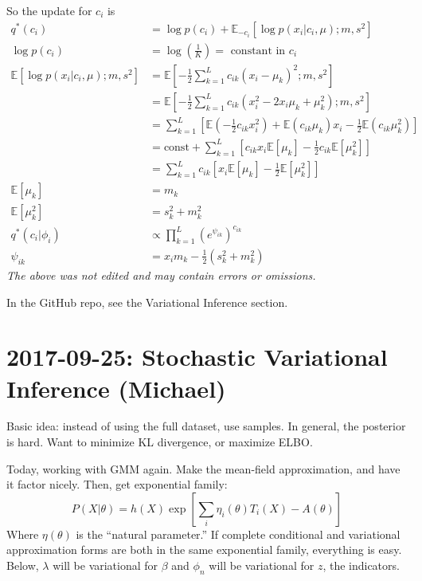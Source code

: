 \documentclass{article}
\newcommand{\E}{ \ensuremath{ \mathbb{E} }}
\begin{document}
So the update for $c_i$ is
\begin{align*}
  q^*(c_i) &= \log p(c_i) + \E_{-c_i} \left[ \log p(x_i | c_i, \mu) ; m, s^2 \right]
  \\
  \log p(c_i) &= \log \left( \frac{1}{K} \right) = \textrm{ constant in } c_i
  \\
  \E \left[ \log p(x_i | c_i, \mu) ; m, s^2 \right] &= \E \left[ -\frac12 \sum_{k=1}^L c_{ik}(x_i-\mu_k)^2 ; m, s^2 \right]
  \\
  &= \E \left[ -\frac12 \sum_{k=1}^L c_{ik}(x_i^2-2x_i\mu_k+\mu_k^2) ; m, s^2 \right]
  \\
  &= \sum_{k=1}^L \left[  \E \left( -\frac12  c_{ik} x_i^2 \right) + \E \left( c_{ik}\mu_k \right)x_i - \frac12 \E(c_{ik}\mu_k^2) \right]
  \\
  &= \textrm{const} + \sum_{k=1}^L \left[ c_{ik} x_i \E[\mu_k] - \frac12 c_{ik} \E[\mu_k^2] \right]
  \\
  &= \sum_{k=1}^L c_{ik} \left[ x_i \E[\mu_k] - \frac12 \E[\mu_k^2] \right]
  \\
  \E[\mu_k] &= m_k
  \\
  \E[\mu_k^2] &= s_k^2 + m_k^2
  \\
  q^*(c_i| \phi_i) &\propto \prod_{k=1}^L (e^{\psi_{ik}})^{c_{ik}}
  \\
  \psi_{ik} &= x_i m_k - \frac12 (s_k^2 + m_k^2)
\end{align*}
\emph{The above was not edited and may contain errors or omissions.}

In the GitHub repo, see the Variational Inference section.

\section{2017-09-25: Stochastic Variational Inference (Michael)}
Basic idea: instead of using the full dataset, use samples.
In general, the posterior is hard. Want to minimize KL divergence, or
maximize ELBO.

Today, working with GMM again. Make the mean-field approximation, and have it factor
nicely. Then, get exponential family:
\begin{equation*}
  P(X|\theta)=h(X)\exp \left[ \sum_i \eta_i(\theta) T_i(X)-A(\theta) \right]
\end{equation*}
Where $\eta(\theta)$ is the ``natural parameter.'' If complete conditional and variational
approximation forms are both in the same exponential family, everything is easy. Below, $\lambda$ will be variational
for $\beta$ and $\phi_n$ will be variational for $z$, the indicators.
\end{document}
